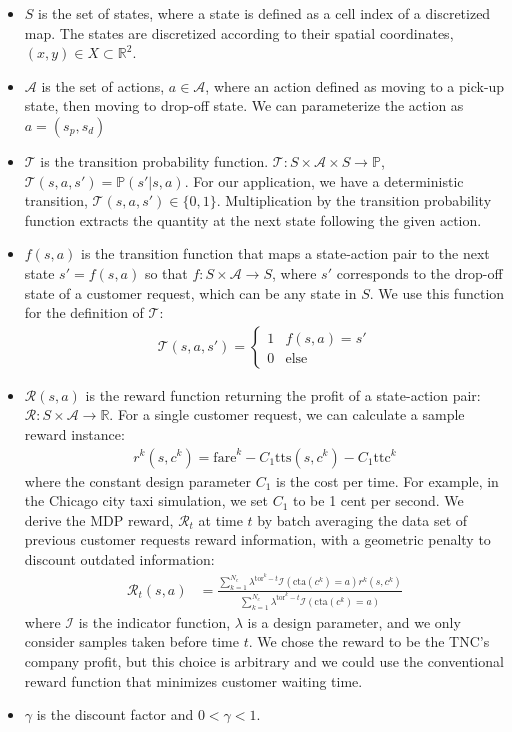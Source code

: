 \documentclass[journal]{IEEEtran}
\newcommand{\ttc}{\mathrm{ttc}}
\newcommand{\tts}{\mathrm{tts}}
\newcommand{\tor}{\mathrm{tor}}
\newcommand{\cta}{\mathrm{cta}}
\begin{document}
\begin{itemize}
    \item $S$ is the set of states, where a state is defined as a cell index of a discretized map. The states are discretized according to their spatial coordinates, $(x,y) \in X \subset \mathbb{R}^2$. 
    \item $\mathcal{A}$ is the set of actions, $a\in\mathcal{A}$, where an action defined as moving to a pick-up state, then moving to drop-off state. We can parameterize the action as $a = (s_p, s_d)$
    \item $\mathcal{T}$ is the transition probability function. $\mathcal{T}:S \times \mathcal{A} \times S \rightarrow \mathbb{P}$, $\mathcal{T}(s,a,s') = \mathbb{P}(s' | s,a)$. For our application, we have a deterministic transition, $\mathcal{T}(s,a,s') \in \{0,1\}$. Multiplication by the transition probability function extracts the quantity at the next state following the given action. 
    \item $f(s,a)$ is the transition function that maps a state-action pair to the next state $s'=f(s,a)$ so that $f: S \times \mathcal{A} \rightarrow S$, where $s'$ corresponds to the drop-off state of a customer request, which can be any state in $S$. We use this function for the definition of $\mathcal{T}$:
    \begin{align*}
        \mathcal{T}(s,a,s') =
        \begin{cases}
        1 & f(s,a) = s' \\ 
        0 & \mathrm{else}
        \end{cases}
    \end{align*}
    \item $\mathcal{R}(s,a)$ is the reward function returning the profit of a state-action pair: $\mathcal{R}:S \times \mathcal{A} \rightarrow \mathbb{R}$. For a single customer request, we can calculate a sample reward instance: 
    \begin{align}
        \label{eq:mdp_instant_reward}
        r^k(s,c^k) = \mathrm{fare}^k - C_1 \tts(s,c^k) - C_1 \ttc^k
    \end{align}
    where the constant design parameter $C_1$ is the cost per time. For example, in the Chicago city taxi simulation, we set $C_1$ to be 1 cent per second. 
    We derive the MDP reward, $\mathcal{R}_t$ at time $t$ by batch averaging the data set of previous customer requests reward information, with a geometric penalty to discount outdated information:
    \begin{align*}
        \mathcal{R}_t(s,a) &= \frac{ \sum_{k = 1}^{ N_c} \lambda^{\tor^k - t} \mathcal{I}(\cta( c^k) = a) r^k(s,c^k) }{ \sum_{k = 1}^{ N_c} \lambda^{\tor^k - t} \mathcal{I}(\cta( c^k) = a)}
    \end{align*}
    where $\mathcal{I}$ is the indicator function, $\lambda$ is a design parameter, and we only consider samples taken before time $t$.
    We chose the reward to be the TNC's company profit, but this choice is arbitrary and we could use the conventional reward function that minimizes customer waiting time. %
    \item $\gamma$ is the discount factor and $0 < \gamma < 1$.
\end{itemize}
\end{document}
